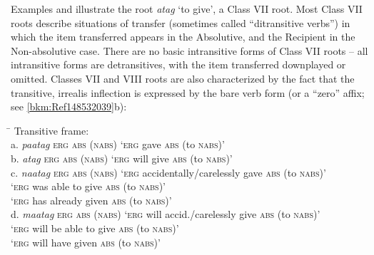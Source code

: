 Examples  and  illustrate the root \textit{atag} ‘to give’, a Class VII root. Most Class VII roots describe situations of transfer (sometimes called “ditransitive verbs”) in which the item transferred appears in the Absolutive, and the Recipient in the Non-absolutive case. There are no basic intransitive forms of Class VII roots – all intransitive forms are detransitives, with the item transferred downplayed or omitted. Classes VII and VIII roots are also characterized by the fact that the transitive, irrealis inflection is expressed by the bare verb form (or a “zero” affix; see \ref{bkm:Ref148532039}b):

\ea
\label{bkm:Ref148532039}
\begin{tabbing}
\hspace{4.3cm} \= \kill
Transitive frame: \\
a.  \textit{paatag} \textsc{erg} \textsc{abs} (\textsc{nabs}) \> ‘\textsc{erg} gave \textsc{abs} (to \textsc{nabs})’ \\
b.  \textit{atag} \textsc{erg} \textsc{abs} (\textsc{nabs}) \> ‘\textsc{erg} will give \textsc{abs} (to \textsc{nabs})’ \\
c.  \textit{naatag} \textsc{erg} \textsc{abs} (\textsc{nabs}) \> ‘\textsc{erg} accidentally/carelessly gave \textsc{abs} (to \textsc{nabs})’ \\
\>      ‘\textsc{erg} was able to give \textsc{abs} (to \textsc{nabs})’ \\
 \>     ‘\textsc{erg} has already given \textsc{abs} (to \textsc{nabs})’ \\
d.  \textit{maatag} \textsc{erg} \textsc{abs} (\textsc{nabs}) \> ‘\textsc{erg} will accid./carelessly give \textsc{abs} (to \textsc{nabs})’ \\
\>      ‘\textsc{erg} will be able to give \textsc{abs} (to \textsc{nabs})’ \\
\>      ‘\textsc{erg} will have given \textsc{abs} (to \textsc{nabs})’  
\end{tabbing}
\z
\ea
